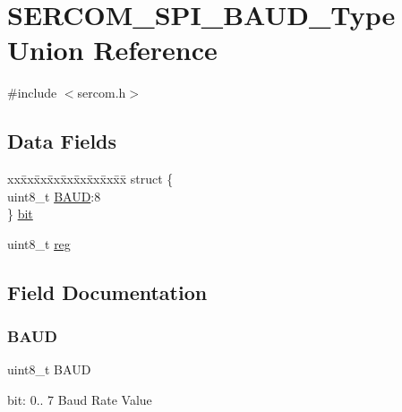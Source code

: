\hypertarget{union_s_e_r_c_o_m___s_p_i___b_a_u_d___type}{}\section{S\+E\+R\+C\+O\+M\+\_\+\+S\+P\+I\+\_\+\+B\+A\+U\+D\+\_\+\+Type Union Reference}
\label{union_s_e_r_c_o_m___s_p_i___b_a_u_d___type}


{\ttfamily \#include $<$sercom.\+h$>$}

\subsection*{Data Fields}
\begin{DoxyCompactItemize}
\item 
\begin{tabbing}
xx\=xx\=xx\=xx\=xx\=xx\=xx\=xx\=xx\=\kill
struct \{\\
\>uint8\_t \mbox{\hyperlink{union_s_e_r_c_o_m___s_p_i___b_a_u_d___type_a3ae66f4ad75f589c1e706fdcfc03f02e}{BAUD}}:8\\
\} \mbox{\hyperlink{union_s_e_r_c_o_m___s_p_i___b_a_u_d___type_a8f55b05db9d8e5b2998f626561be5f84}{bit}}\\

\end{tabbing}\item 
uint8\+\_\+t \mbox{\hyperlink{union_s_e_r_c_o_m___s_p_i___b_a_u_d___type_a9428adc9af4653a2050e2536b55dec8d}{reg}}
\end{DoxyCompactItemize}


\subsection{Field Documentation}
\mbox{\label{union_s_e_r_c_o_m___s_p_i___b_a_u_d___type_a3ae66f4ad75f589c1e706fdcfc03f02e}} 
\subsubsection{\texorpdfstring{BAUD}{BAUD}}
{\footnotesize\ttfamily uint8\+\_\+t B\+A\+UD}

bit\+: 0.. 7 Baud Rate Value \mbox{\label{union_s_e_r_c_o_m___s_p_i___b_a_u_d___type_a8f55b05db9d8e5b2998f626561be5f84}} 
